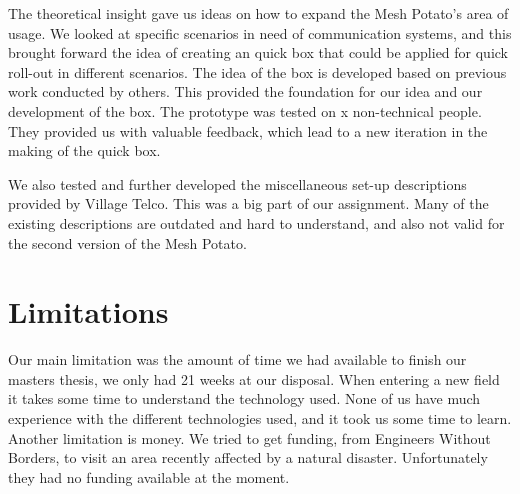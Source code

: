 The theoretical insight gave us ideas on how to expand the Mesh Potato's area of usage. We looked at specific scenarios in need of communication systems, and this brought forward the idea of creating an \gls{quick} box that could be applied for quick roll-out in different scenarios. The idea of the box is developed based on previous work conducted by others. This provided the foundation for our idea and our development of the box. The prototype was tested on x non-technical people. They provided us with valuable feedback, which lead to a new iteration in the making of the \gls{quick} box. 

We also tested and further developed the miscellaneous set-up descriptions provided by Village Telco. This was a big part of our assignment. Many of the existing descriptions are outdated and hard to understand, and also not valid for the second version of the Mesh Potato.



\section{Limitations}
Our main limitation was the amount of time we had available to finish our masters thesis, we only had 21 weeks at our disposal. When entering a new field it takes some time to understand the technology used. None of us have much experience with the different technologies used, and it took us some time to learn. Another limitation is money. We tried to get funding, from Engineers Without Borders, to visit an area recently affected by a natural disaster. Unfortunately they had no funding available at the moment.


